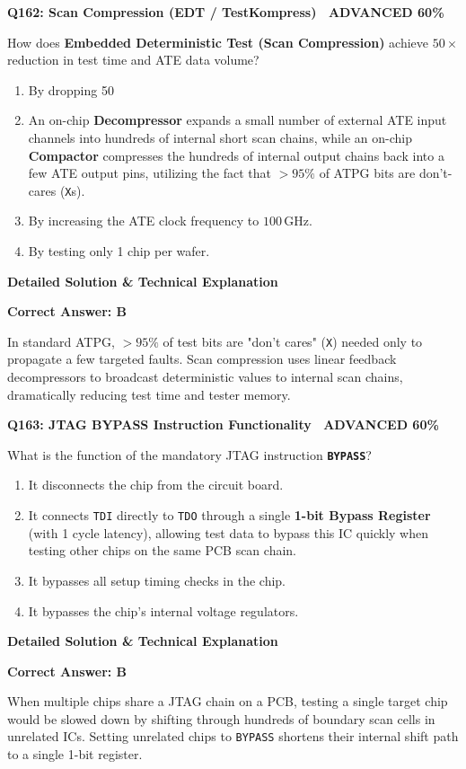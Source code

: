 \documentclass[11pt,a4paper]{article}
\newcommand{\badgeadv}{{\color{white}\colorbox{advred}{\bfseries\sffamily\tiny\ ADVANCED 60\%\ }}}
\newenvironment{qbox}[2]{%
  \begin{mdframed}[style=qstyle]%
  {\bfseries\sffamily\color{primaryblue}#1 \hfill #2}\par\vspace{2pt}%
}{%
  \end{mdframed}%
}
\newenvironment{ansbox}{%
  \begin{mdframed}[style=ansstyle]%
  {\bfseries\sffamily\color{ansgreen}\small Detailed Solution \& Technical Explanation}\par\vspace{2pt}\small%
}{%
  \end{mdframed}%
}
\begin{document}
\begin{qbox}{Q162: Scan Compression (EDT / TestKompress)}{\badgeadv}
How does \textbf{Embedded Deterministic Test (Scan Compression)} achieve $50\times$ reduction in test time and ATE data volume?
\begin{enumerate}[label=\textbf{\Alph*.}]
  \item By dropping 50%
  \item An on-chip \textbf{Decompressor} expands a small number of external ATE input channels into hundreds of internal short scan chains, while an on-chip \textbf{Compactor} compresses the hundreds of internal output chains back into a few ATE output pins, utilizing the fact that $>95\%$ of ATPG bits are don't-cares (\texttt{X}s).
  \item By increasing the ATE clock frequency to $100\,\text{GHz}$.
  \item By testing only 1 chip per wafer.
\end{enumerate}
\end{qbox}
\begin{ansbox}
\textbf{Correct Answer: B}

In standard ATPG, $>95\%$ of test bits are "don't cares" (\texttt{X}) needed only to propagate a few targeted faults. Scan compression uses linear feedback decompressors to broadcast deterministic values to internal scan chains, dramatically reducing test time and tester memory.
\end{ansbox}

\begin{qbox}{Q163: JTAG BYPASS Instruction Functionality}{\badgeadv}
What is the function of the mandatory JTAG instruction \textbf{\texttt{BYPASS}}?
\begin{enumerate}[label=\textbf{\Alph*.}]
  \item It disconnects the chip from the circuit board.
  \item It connects \texttt{TDI} directly to \texttt{TDO} through a single \textbf{1-bit Bypass Register} (with 1 cycle latency), allowing test data to bypass this IC quickly when testing other chips on the same PCB scan chain.
  \item It bypasses all setup timing checks in the chip.
  \item It bypasses the chip's internal voltage regulators.
\end{enumerate}
\end{qbox}
\begin{ansbox}
\textbf{Correct Answer: B}

When multiple chips share a JTAG chain on a PCB, testing a single target chip would be slowed down by shifting through hundreds of boundary scan cells in unrelated ICs. Setting unrelated chips to \texttt{BYPASS} shortens their internal shift path to a single 1-bit register.
\end{ansbox}
\end{document}
